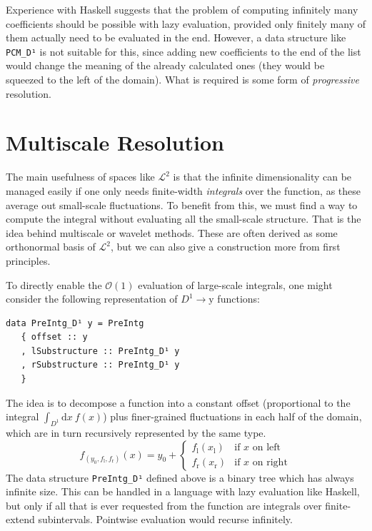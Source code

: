 \documentclass[sigplan,screen]{acmart}
\theoremstyle{acmplain}
\theoremstyle{acmdefinition}
\begin{document}
Experience with Haskell suggests that the problem of computing infinitely many coefficients should be possible with lazy evaluation, provided only finitely many of them actually need to be evaluated in the end.
However, a data structure like \lstinline`PCM_D¹` is not suitable for this, since adding new coefficients to the end of the list would change the meaning of the already calculated ones (they would be squeezed to the left of the domain).
What is required is some form of \emph{progressive} resolution.

\section{Multiscale Resolution}\label{mulScaleResoIntro}
The main usefulness of spaces like $\mathcal{L}^2$ is that the infinite dimensionality can be managed easily if one only needs finite-width \emph{integrals} over the function, as these average out small-scale fluctuations.
To benefit from this, we must find a way to compute the integral without evaluating all the small-scale structure.
That is the idea behind multiscale or wavelet methods.
These are often derived as some orthonormal basis of $\mathcal{L}^2$, but we can also give a construction more from first principles.

To directly enable the $\mathcal{O}(1)$ evaluation of large-scale integrals, one might consider the following representation of $D^1\to \mathrm{y}$ functions:
\begin{lstlisting}[xleftmargin=1.5em]
data PreIntg_D¹ y = PreIntg
   { offset :: y
   , lSubstructure :: PreIntg_D¹ y
   , rSubstructure :: PreIntg_D¹ y
   }
\end{lstlisting}
The idea is to decompose a function into a constant offset (proportional to the integral $\int_{D^1}\!\mathrm{d}x\:f(x)$) plus finer-grained fluctuations in each half of the domain, which are in turn recursively represented by the same type.
\[
  f_{(y_0,f_\mathrm{l},f_\mathrm{r})}(x)
      = y_0 + \begin{cases}
                 f_\mathrm{l}(x_\mathrm{l}) & \text{if $x$ on left}
              \\ f_\mathrm{r}(x_\mathrm{r}) & \text{if $x$ on right}
              \end{cases}
\]
The data structure \lstinline`PreIntg_D¹` defined above is a binary tree which has always infinite size.
This can be handled in a language with lazy evaluation like Haskell,
but only if all that is ever requested from the function are integrals over finite-extend subintervals.
Pointwise evaluation would recurse infinitely.
\end{document}
